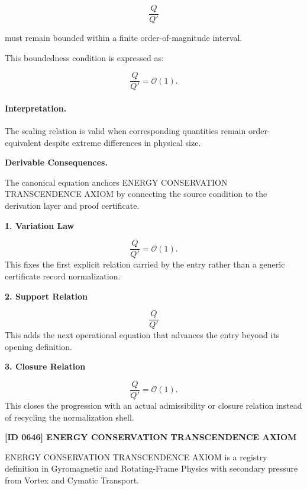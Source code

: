 \begin{equation}
\frac{Q}{Q'}
\end{equation}

must remain bounded within a finite order-of-magnitude interval.

This boundedness condition is expressed as:

\begin{equation}
\boxed{
\frac{Q}{Q'}
=
\mathcal{O}(1).
}
\end{equation}

\paragraph{Interpretation.}
The scaling relation is valid when corresponding quantities remain order-equivalent despite extreme differences in physical size.

\par\vspace{0.35em}
\noindent\textbf{Derivable Consequences.}\quad
\begingroup
\footnotesize
\raggedright
The canonical equation anchors ENERGY CONSERVATION TRANSCENDENCE AXIOM by connecting the source condition to the derivation layer and proof certificate.
\par\endgroup

\noindent\textbf{1. Variation Law}\par
\[
\frac{Q}{Q'} = \mathcal{O}(1).
\]
\noindent This fixes the first explicit relation carried by the entry rather than a generic certificate record normalization.\par
\noindent\textbf{2. Support Relation}\par
\[
\frac{Q}{Q'}
\]
\noindent This adds the next operational equation that advances the entry beyond its opening definition.\par
\noindent\textbf{3. Closure Relation}\par
\[
\boxed{ \frac{Q}{Q'} = \mathcal{O}(1). }
\]
\noindent This closes the progression with an actual admissibility or closure relation instead of recycling the normalization shell.\par

\clearpage
\noindent\textbf{[ID 0646] ENERGY CONSERVATION TRANSCENDENCE AXIOM}\par
\vspace{0.35em}
\begingroup\small
{}
ENERGY CONSERVATION TRANSCENDENCE AXIOM is a registry definition in Gyromagnetic and Rotating-Frame Physics with secondary pressure from Vortex and Cymatic Transport.

